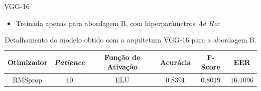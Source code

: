 \begin{frame}{VGG-16}

  \begin{itemize}
    \item Treinada apenas para abordagem B, com hiperparâmetros \emph{Ad Hoc}
  \end{itemize}

  \begin{table}[h!]
    \centering
    \caption{Detalhamento do modelo obtido com a arquitetura VGG-16 para a abordagem B.}
    \label{tab:vgg}
    \begin{tabular}{cccccc}
    \toprule
    \textbf{Otimizador} & \textbf{\emph{Patience}}  & \textbf{Função de Ativação} & \textbf{Acurácia} & \textbf{F-Score} & \textbf{EER} \\
    \midrule
    RMSprop & 10 & ELU & $0.8391$ & $0.8019$ & $16.1096$ \\
    \bottomrule
    \end{tabular}
    \end{table}

\end{frame}

